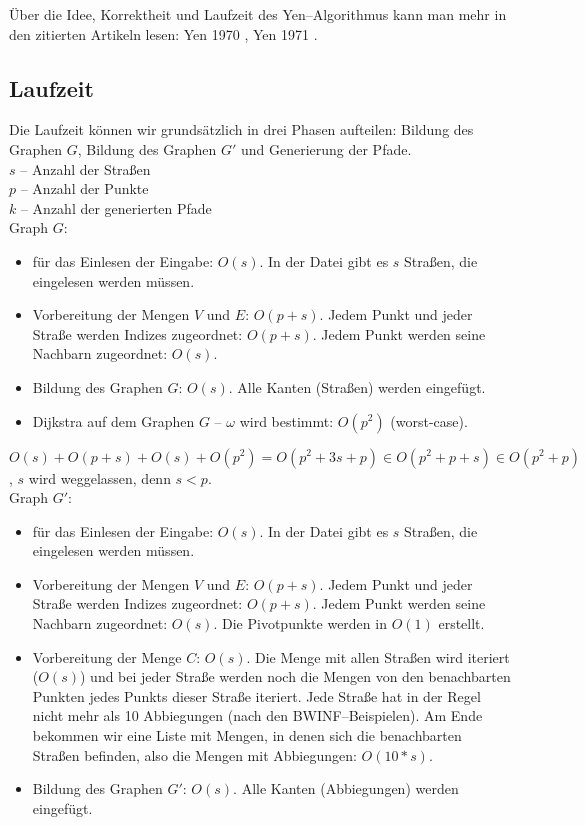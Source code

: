 \documentclass[a4paper,10pt,ngerman]{scrartcl}
\begin{document}
Über die Idee, Korrektheit und Laufzeit des Yen–Algorithmus kann man mehr in den zitierten Artikeln lesen:
Yen 1970 \cite{yen1}, Yen 1971 \cite{yen2}.


\subsection{Laufzeit}

Die Laufzeit können wir grundsätzlich in drei Phasen aufteilen: Bildung des Graphen $G$, Bildung des Graphen $G'$
und Generierung der Pfade.\\

\noindent
$s$ -- Anzahl der Straßen\\
$p$ -- Anzahl der Punkte \\
$k$ -- Anzahl der generierten Pfade\\

Graph $G$:
\begin{itemize}
  \item für das Einlesen der Eingabe: $O(s)$. In der Datei gibt es $s$ Straßen, die eingelesen werden müssen.
  \item Vorbereitung der Mengen $V$ und $E$: $O(p + s)$. Jedem Punkt und jeder Straße werden Indizes zugeordnet: $O(p+s)$.
  Jedem Punkt werden seine Nachbarn zugeordnet: $O(s)$.
  \item Bildung des Graphen $G$: $O(s)$. Alle Kanten (Straßen) werden eingefügt. 
  \item Dijkstra auf dem Graphen $G$ -- $\omega$ wird bestimmt: $O(p^2)$ (worst-case).
\end{itemize}

$O(s) + O(p + s) + O(s) + O(p^2) = O(p^2 + 3s + p) \in O(p^2 + p + s) \in O(p^2 + p)$,
$s$ wird weggelassen, denn $s < p$.\\

Graph $G'$:
\begin{itemize}
  \item für das Einlesen der Eingabe: $O(s)$. In der Datei gibt es $s$ Straßen, die eingelesen werden müssen.
  \item Vorbereitung der Mengen $V$ und $E$: $O(p + s)$. Jedem Punkt und jeder Straße werden Indizes zugeordnet: $O(p+s)$.
  Jedem Punkt werden seine Nachbarn zugeordnet: $O(s)$. Die Pivotpunkte werden in $O(1)$ erstellt. 
  \item Vorbereitung der Menge $C$: $O(s)$. Die Menge mit allen Straßen wird iteriert ($O(s)$) und bei jeder Straße
  werden noch die Mengen von den benachbarten Punkten jedes Punkts dieser Straße iteriert.
  Jede Straße hat in der Regel nicht mehr als 10 Abbiegungen (nach den BWINF--Beispielen).
  Am Ende bekommen wir eine Liste mit Mengen, in denen
  sich die benachbarten Straßen befinden, also die Mengen mit Abbiegungen: $O(10*s)$.
  \item Bildung des Graphen $G'$: $O(s)$. Alle Kanten (Abbiegungen) werden eingefügt. 
\end{itemize}
\end{document}
